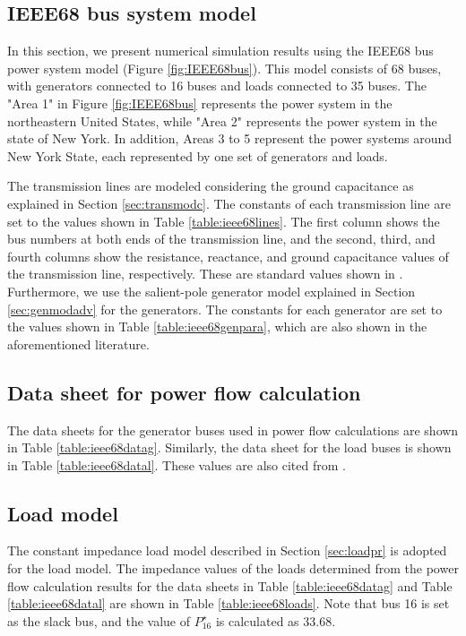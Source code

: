 \documentclass[graybox, envcountchap]{svmult}
\begin{document}
\subsection{IEEE68 bus system model}

In this section, we present numerical simulation results using the IEEE68 bus
power system model (Figure \ref{fig:IEEE68bus}). This model consists of 68
buses, with generators connected to 16 buses and loads connected to 35 buses.
The "Area 1" in Figure \ref{fig:IEEE68bus} represents the power system in the
northeastern United States, while "Area 2" represents the power system in the
state of New York. In addition, Areas 3 to 5 represent the power systems around
New York State, each represented by one set of generators and loads.

The transmission lines are modeled considering the ground capacitance as
explained in Section \ref{sec:transmodc}. The constants of each transmission
line are set to the values shown in Table \ref{table:ieee68lines}. The first
column shows the bus numbers at both ends of the transmission line, and the
second, third, and fourth columns show the resistance, reactance, and ground
capacitance values of the transmission line, respectively. These are standard
values shown in \cite[Appendix A]{pal2006robust}. Furthermore, we use the
salient-pole generator model explained in Section \ref{sec:genmodadv} for the
generators.  The constants for each generator are set to the values shown in
Table \ref{table:ieee68genpara}, which are also shown in the aforementioned
literature.

\subsection{Data sheet for power flow calculation}

The data sheets for the generator buses used in power flow calculations are
shown in Table \ref{table:ieee68datag}. Similarly, the data sheet for the load
buses is shown in Table \ref{table:ieee68datal}. These values are also cited
from \cite[Appendix A]{pal2006robust}.

\subsection{Load model}

The constant impedance load model described in Section \ref{sec:loadpr} is
adopted for the load model. The impedance values of the loads determined from
the power flow calculation results for the data sheets in Table
\ref{table:ieee68datag} and Table \ref{table:ieee68datal} are shown in Table
\ref{table:ieee68loads}. Note that bus 16 is set as the slack bus, and the value
of $P_{16}^{\star}$ is calculated as 33.68.
\end{document}
